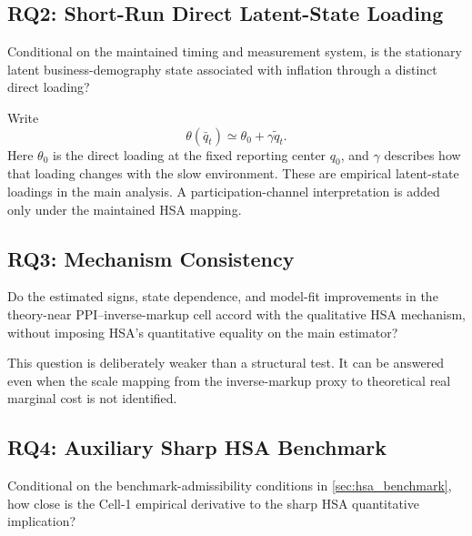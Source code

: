 \documentclass[11pt]{article}
\begin{document}
\subsection{RQ2: Short-Run Direct Latent-State Loading}

Conditional on the maintained timing and measurement system, is the stationary latent business-demography state associated with inflation through a distinct direct loading?

Write
\begin{equation}
\theta(\bar q_t)\simeq \theta_0+\gamma\tilde q_t.
\end{equation}
Here \(\theta_0\) is the direct loading at the fixed reporting center \(q_0\), and \(\gamma\) describes how that loading changes with the slow environment. These are empirical latent-state loadings in the main analysis. A participation-channel interpretation is added only under the maintained HSA mapping.

\subsection{RQ3: Mechanism Consistency}

Do the estimated signs, state dependence, and model-fit improvements in the theory-near PPI--inverse-markup cell accord with the qualitative HSA mechanism, without imposing HSA's quantitative equality on the main estimator?

This question is deliberately weaker than a structural test. It can be answered even when the scale mapping from the inverse-markup proxy to theoretical real marginal cost is not identified.

\subsection{RQ4: Auxiliary Sharp HSA Benchmark}

Conditional on the benchmark-admissibility conditions in \cref{sec:hsa_benchmark}, how close is the Cell-1 empirical derivative to the sharp HSA quantitative implication?
\end{document}
